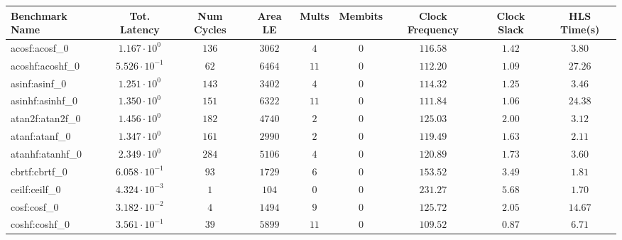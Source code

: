 \begin{tabular}{|l|c|c|c|c|c|c|c|c|}
\hline
Benchmark Name               & Tot. Latency            & Num Cycles & Area LE    & Mults   & Membits    & Clock Frequency & Clock Slack & HLS Time(s) \\
\hline
acosf:acosf\_0               & $ 1.167 \cdot 10^{0}  $ & $ 136    $ & $ 3062   $ & $ 4   $ & $ 0      $ & $ 116.58      $ & $ 1.42    $ & $ 3.80    $ \\
acoshf:acoshf\_0             & $ 5.526 \cdot 10^{-1} $ & $ 62     $ & $ 6464   $ & $ 11  $ & $ 0      $ & $ 112.20      $ & $ 1.09    $ & $ 27.26   $ \\
asinf:asinf\_0               & $ 1.251 \cdot 10^{0}  $ & $ 143    $ & $ 3402   $ & $ 4   $ & $ 0      $ & $ 114.32      $ & $ 1.25    $ & $ 3.46    $ \\
asinhf:asinhf\_0             & $ 1.350 \cdot 10^{0}  $ & $ 151    $ & $ 6322   $ & $ 11  $ & $ 0      $ & $ 111.84      $ & $ 1.06    $ & $ 24.38   $ \\
atan2f:atan2f\_0             & $ 1.456 \cdot 10^{0}  $ & $ 182    $ & $ 4740   $ & $ 2   $ & $ 0      $ & $ 125.03      $ & $ 2.00    $ & $ 3.12    $ \\
atanf:atanf\_0               & $ 1.347 \cdot 10^{0}  $ & $ 161    $ & $ 2990   $ & $ 2   $ & $ 0      $ & $ 119.49      $ & $ 1.63    $ & $ 2.11    $ \\
atanhf:atanhf\_0             & $ 2.349 \cdot 10^{0}  $ & $ 284    $ & $ 5106   $ & $ 4   $ & $ 0      $ & $ 120.89      $ & $ 1.73    $ & $ 3.60    $ \\
cbrtf:cbrtf\_0               & $ 6.058 \cdot 10^{-1} $ & $ 93     $ & $ 1729   $ & $ 6   $ & $ 0      $ & $ 153.52      $ & $ 3.49    $ & $ 1.81    $ \\
ceilf:ceilf\_0               & $ 4.324 \cdot 10^{-3} $ & $ 1      $ & $ 104    $ & $ 0   $ & $ 0      $ & $ 231.27      $ & $ 5.68    $ & $ 1.70    $ \\
cosf:cosf\_0                 & $ 3.182 \cdot 10^{-2} $ & $ 4      $ & $ 1494   $ & $ 9   $ & $ 0      $ & $ 125.72      $ & $ 2.05    $ & $ 14.67   $ \\
coshf:coshf\_0               & $ 3.561 \cdot 10^{-1} $ & $ 39     $ & $ 5899   $ & $ 11  $ & $ 0      $ & $ 109.52      $ & $ 0.87    $ & $ 6.71    $ \\

\end{tabular}
